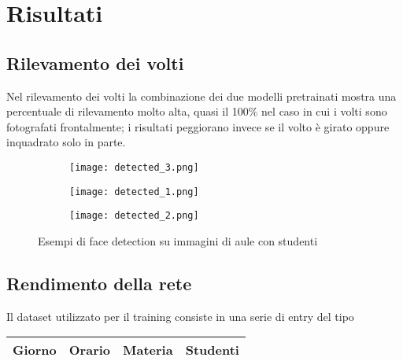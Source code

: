 \chapter{Risultati}
\label{section:results}

\section{Rilevamento dei volti}
\label{section:results_fd}

Nel rilevamento dei volti la combinazione dei due modelli pretrainati mostra
una percentuale di rilevamento molto alta, quasi il 100\% nel caso in cui i volti sono 
fotografati frontalmente; i risultati peggiorano invece se il volto è girato oppure 
inquadrato solo in parte. 

\smallskip

\begin{figure}[h]
    \centering
    \begin{subfigure}[b]{0.7\linewidth}
      \texttt{[image: detected\_3.png]}
    \end{subfigure}

    \smallskip
    
    \begin{subfigure}[b]{0.7\linewidth}
        \texttt{[image: detected\_1.png]}
    \end{subfigure}

    \smallskip
    
    \begin{subfigure}[b]{0.7\linewidth}
        \texttt{[image: detected\_2.png]}
    \end{subfigure}
    \caption{Esempi di face detection su immagini di aule con studenti}
    \label{fig:example_opencv}
\end{figure}

\section{Rendimento della rete}
\label{section:results_ml}

Il dataset utilizzato per il training consiste in una serie di entry del 
tipo

\begin{table}[h]
    \begin{small}
        \label{tab:dataset_entry}
        \begin{center}
            \begin{tabular}[c]{c|c|c|c}
                \hline
                \textbf{Giorno} & \textbf{Orario} & \textbf{Materia} & \textbf{Studenti} \\
                \hline
            \end{tabular}
        \end{center}
    \end{small}
\end{table}

